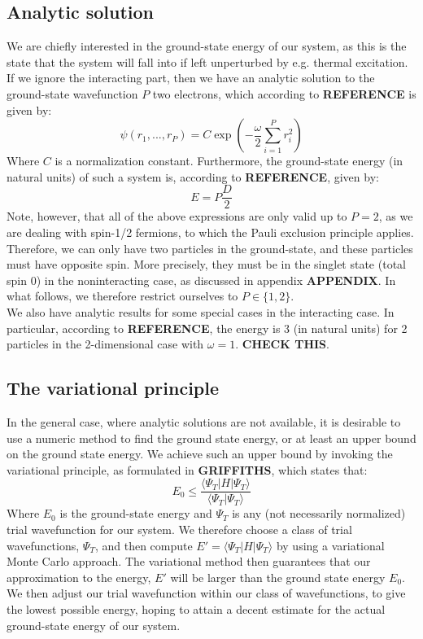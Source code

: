 \documentclass[a4paper, 10pt]{article}
\begin{document}
	\subsection{Analytic solution}
	We are chiefly interested in the ground-state energy of our system, as this is the state that the system will fall into if left unperturbed by e.g. thermal excitation. If we ignore the interacting part, then we have an analytic solution to the ground-state wavefunction $P$ two electrons, which according to \textbf{REFERENCE} is given by:
	\begin{equation}
	\psi(r_1,...,r_P)=C\exp\left(-\frac{\omega}{2}\sum_{i=1}^P r_i^2\right)
	\end{equation}
	Where $C$ is a normalization constant. Furthermore, the ground-state energy (in natural units) of such a system is, according to \textbf{REFERENCE}, given by:
	\begin{equation}\label{eq:Ground-state-energy}
	E=P\frac{D}{2}
	\end{equation}
	Note, however, that all of the above expressions are only valid up to $P=2$, as we are dealing with spin-1/2 fermions, to which the Pauli exclusion principle applies. Therefore, we can only have two particles in the ground-state, and these particles must have opposite spin. More precisely, they must be in the singlet state (total spin $0$) in the noninteracting case, as discussed in appendix \textbf{APPENDIX}. In what follows, we therefore restrict ourselves to $P\in \{1,2\}$.\\
	\linebreak
	We also have analytic results for some special cases in the interacting case. In particular, according to \textbf{REFERENCE}, the energy is $3$ (in natural units) for 2 particles in the 2-dimensional case with $\omega=1$. \textbf{CHECK THIS}.
	\subsection{The variational principle}
	 In the general case, where analytic solutions are not available, it is desirable to use a numeric method to find the ground state energy, or at least an upper bound on the ground state energy. We achieve such an upper bound by invoking the variational principle, as formulated in \textbf{GRIFFITHS}, which states that:
	\begin{equation}\label{eq:Variational_Principle}
	E_0\leq \frac{\langle \Psi_T | H |\Psi_T \rangle}{\langle \Psi_T | \Psi_T \rangle}
	\end{equation} 
	Where $E_0$ is the ground-state energy and $\Psi_T$ is any (not necessarily normalized) trial wavefunction for our system. We therefore choose a class of trial wavefunctions, $\Psi_T$, and then compute $E'=\langle \Psi_T | H |\Psi_T\rangle$ by using a variational Monte Carlo approach. The variational method then guarantees that our approximation to the energy, $E'$ will be larger than the ground state energy $E_0$. We then adjust our trial wavefunction within our class of wavefunctions, to give the lowest possible energy, hoping to attain a decent estimate for the actual ground-state energy of our system. 
\end{document}
